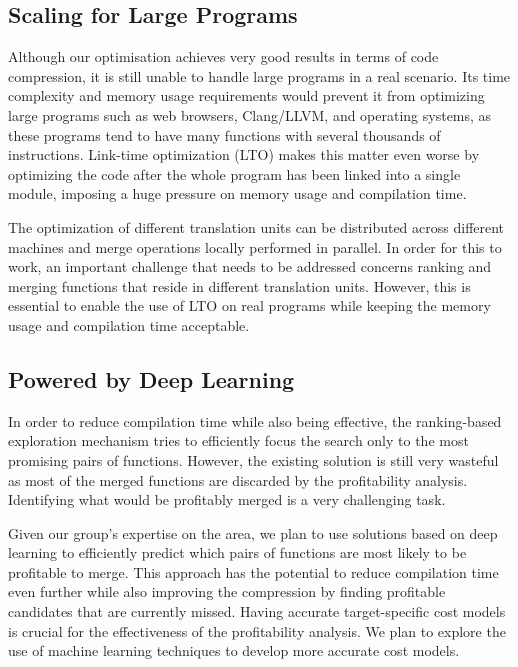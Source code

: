 \subsection{Scaling for Large Programs}

Although our optimisation achieves very good results in terms of code compression, it is still unable to handle large programs in a real scenario.
Its time complexity and memory usage requirements would prevent it from optimizing large programs such as web browsers, Clang/LLVM, and operating systems, as these programs tend to have many functions with several thousands of instructions.
Link-time optimization (LTO) makes this matter even worse by optimizing the code after the whole program has been linked into a single module, imposing a huge pressure on memory usage and compilation time.

The optimization of different translation units can be distributed across different machines and merge operations locally performed in parallel.
In order for this to work, an important challenge that needs to be addressed concerns ranking and merging functions that reside in different translation units.
However, this is essential to enable the use of LTO on real programs while keeping the memory usage and compilation time acceptable.

\subsection{Powered by Deep Learning}

In order to reduce compilation time while also being effective, 
the ranking-based exploration mechanism tries to efficiently focus the search 
only to the most promising pairs of functions.
However, the existing solution is still very wasteful as most of the merged functions are
discarded by the profitability analysis.
Identifying what would be profitably merged is a very challenging task.

Given our group's expertise on the area, we plan to use solutions based on deep learning to efficiently predict which pairs of functions are most likely to be profitable to merge.
This approach has the potential to reduce compilation time even further while also improving the compression by finding profitable candidates that are currently missed.
Having accurate target-specific cost models is crucial for the effectiveness of the profitability analysis.
We plan to explore the use of machine learning techniques to develop more accurate cost models.

